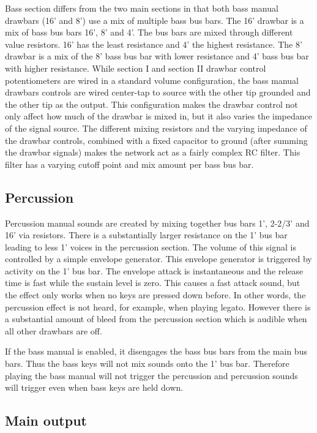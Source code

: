 \documentclass[11pt,a4paper]{article}
\begin{document}
Bass section differs from the two main sections in that both bass manual drawbars (16' and 8') use a mix of multiple bass bus bars. The 16' drawbar is a mix of bass bus bars 16', 8' and 4'. The bus bars are mixed through different value resistors. 16' has the least resistance and 4' the highest resistance. The 8' drawbar is a mix of the 8' bass bus bar with lower resistance and 4' bass bus bar with higher resistance. While section I and section II drawbar control potentiometers are wired in a standard volume configuration, the bass manual drawbars controls are wired center-tap to source with the other tip grounded and the other tip as the output. This configuration makes the drawbar control not only affect how much of the drawbar is mixed in, but it also varies the impedance of the signal source. The different mixing resistors and the varying impedance of the drawbar controls, combined with a fixed capacitor to ground (after summing the drawbar signals) makes the network act as a fairly complex RC filter. This filter has a varying cutoff point and mix amount per bass bus bar.

\subsection{Percussion}

Percussion manual sounds are created by mixing together bus bars 1', 2-2/3' and 16' via resistors. There is a substantially larger resistance on the 1' bus bar leading to less 1' voices in the percussion section. The volume of this signal is controlled by a simple envelope generator. This envelope generator is triggered by activity on the 1' bus bar. The envelope attack is instantaneous and the release time is fast while the sustain level is zero. This causes a fast attack sound, but the effect only works when no keys are pressed down before. In other words, the percussion effect is not heard, for example, when playing legato. However there is a substantial amount of bleed from the percussion section which is audible when all other drawbars are off.

If the bass manual is enabled, it disengages the bass bus bars from the main bus bars. Thus the bass keys will not mix sounds onto the 1' bus bar. Therefore playing the bass manual will not trigger the percussion and percussion sounds will trigger even when bass keys are held down.

\subsection{Main output}
\end{document}
